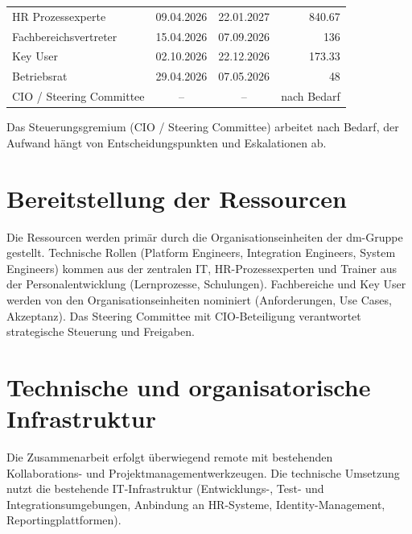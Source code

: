 \begin{xltabular}{\textwidth}{@{}Xccr@{}}
    \ac{HR} Prozessexperte & 09.04.2026 & 22.01.2027 & 840.67 \\

    Fachbereichsvertreter & 15.04.2026 & 07.09.2026 & 136 \\

    Key User & 02.10.2026 & 22.12.2026 & 173.33 \\

    Betriebsrat & 29.04.2026 & 07.05.2026 & 48 \\

    \ac{CIO} / Steering Committee & -- & -- & nach Bedarf \\

    \hline
\end{xltabular}

Das Steuerungsgremium (\ac{CIO} / Steering Committee) arbeitet nach Bedarf, der
Aufwand hängt von Entscheidungspunkten und Eskalationen ab.

\section{Bereitstellung der Ressourcen}

Die Ressourcen werden primär durch die Organisationseinheiten der dm-Gruppe
gestellt. Technische Rollen (Platform Engineers, Integration Engineers, System
Engineers) kommen aus der zentralen \ac{IT}, \ac{HR}-Prozessexperten und
Trainer aus der Personalentwicklung (Lernprozesse, Schulungen). Fachbereiche
und Key User werden von den Organisationseinheiten nominiert (Anforderungen,
Use Cases, Akzeptanz). Das Steering Committee mit \ac{CIO}-Beteiligung
verantwortet strategische Steuerung und Freigaben.

\section{Technische und organisatorische Infrastruktur}

Die Zusammenarbeit erfolgt überwiegend remote mit bestehenden
Kollaborations- und Projektmanagementwerkzeugen. Die technische Umsetzung
nutzt die bestehende \ac{IT}-Infrastruktur (Entwicklungs-, Test- und
Integrationsumgebungen, Anbindung an \ac{HR}-Systeme, Identity-Management,
Reportingplattformen).
